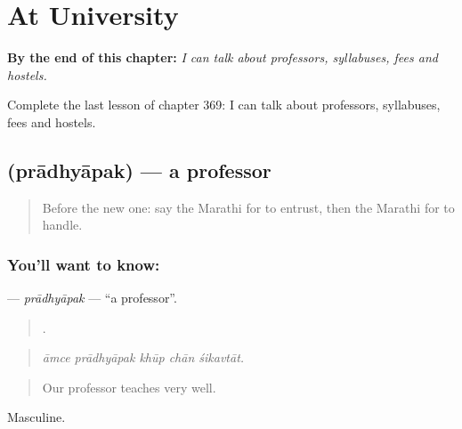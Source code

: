 
\chapter{At University}
\label{ch:mr-at-university}

\begin{chapteropening}
\textbf{By the end of this chapter:} \emph{I can talk about professors, syllabuses, fees and hostels.}

Complete the last lesson of chapter 369: I can talk about professors, syllabuses, fees and hostels.
\end{chapteropening}

\section[\texorpdfstring{\mr{प्राध्यापक} (prādhyāpak)}{प्राध्यापक (prādhyāpak)}]{ (prādhyāpak) — a professor}

\label{lesson:MR-C369-pradhyapak}



\begin{quote}
Before the new one: say the Marathi for to entrust, then the Marathi for to handle.
\end{quote}

\subsection*{You'll want to know: }
\textbf{} — \emph{prādhyāpak} — \textquotedblleft{}a professor\textquotedblright{}.

\begin{quote}
    .
\end{quote}

\begin{quote}
\emph{āmce prādhyāpak khūp chān śikavtāt.}
\end{quote}

\begin{quote}
Our professor teaches very well.
\end{quote}

Masculine.

